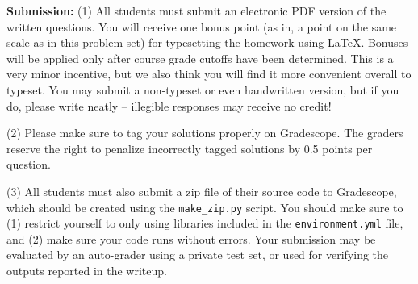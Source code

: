 {\bf Submission:} 
(1) All students must submit an electronic PDF version of the written questions. You will receive one bonus point (as in, a point on the same scale as in this problem set) for typesetting the homework using \LaTeX. Bonuses will be applied only after course grade cutoffs have been determined.
This is a very minor incentive, but we also think you will find it more convenient overall to typeset. You may submit a non-typeset or even handwritten version, but if you do, please write neatly -- illegible responses may receive no credit!

(2) Please make sure to tag your solutions properly on Gradescope.
The graders reserve the right to penalize incorrectly tagged solutions by 0.5 points per question.

(3) All students must also submit a zip file of
their source code to Gradescope, which should be created using the
\texttt{make\_zip.py} script. You
should make sure to (1) restrict yourself to only using libraries included in
the
\texttt{environment.yml} file, and (2) make sure your code runs without errors.
Your submission may be evaluated by an auto-grader using a private test set, or used for verifying the outputs reported in the writeup. 



